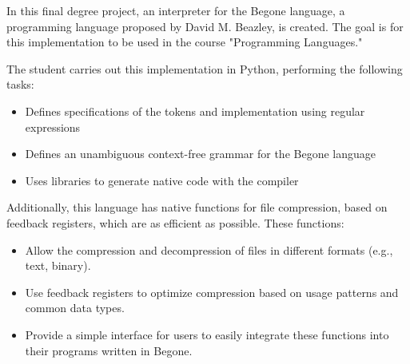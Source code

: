 In this final degree project, an interpreter for the Begone language, a programming language proposed by David M. Beazley, is created. The goal is for this implementation to be used in the course "Programming Languages."

The student carries out this implementation in Python, performing the following tasks:

\begin{itemize}
  \item Defines specifications of the tokens and implementation using regular expressions
  \item Defines an unambiguous context-free grammar for the Begone language
  \item Uses libraries to generate native code with the compiler
\end{itemize}

Additionally, this language has native functions for file compression, based on feedback registers, which are as efficient as possible. These functions:

\begin{itemize}
  \item Allow the compression and decompression of files in different formats (e.g., text, binary).
  \item Use feedback registers to optimize compression based on usage patterns and common data types.
  \item Provide a simple interface for users to easily integrate these functions into their programs written in Begone.

\end{itemize}
